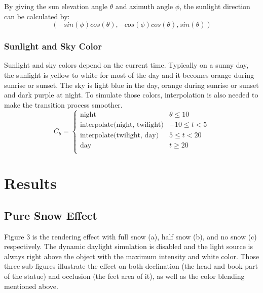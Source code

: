 \documentclass{article}
\begin{document}
By giving the sun elevation angle \( \theta \) and azimuth angle \( \phi \), the sunlight direction can be calculated by:
\[
  (-sin(\phi)cos(\theta), -cos(\phi)cos(\theta), sin(\theta))
\]

\subsubsection {Sunlight and Sky Color}
Sunlight and sky colors depend on the current time. Typically on a sunny day, the sunlight is yellow to white for most of the day and 
it becomes orange during sunrise or sunset. The sky is light blue in the day, orange during sunrise or sunset and dark purple at night. 
To simulate those colors, interpolation is also needed to make the transition process smoother. 
\[
  C_{b}=
  \left\{
    \begin{array}{ll}
      \text{night} & \theta \leq 10 \\
      \text{interpolate(night, twilight)} &  -10 \leq t < 5 \\
      \text{interpolate(twilight, day)} &  5 \leq t < 20 \\
      \text{day} & t \geq 20 \\
    \end{array} 
  \right. 
\]

\section{Results}

\subsection {Pure Snow Effect}
Figure 3 is the rendering effect with full snow (a), half snow (b), and no snow (c) respectively. The dynamic daylight simulation is 
disabled and the light source is always right above the object with the maximum intensity and white color. Those three sub-figures 
illustrate the effect on both declination (the head and book part of the statue) and occlusion (the feet area of it), as well as the 
color blending mentioned above.
\end{document}
